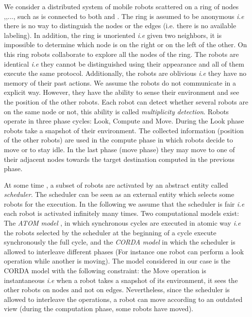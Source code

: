 \documentclass[12pt]{llncs}
\begin{document}
We consider a distributed system of mobile robots scattered on a ring of  nodes ,,...,  such as  is connected to both  and . The ring is assumed to be anonymous \textit{i.e} there is no way to distinguish the nodes or the edges (i.e. there is no available labeling). In addition, the ring is unoriented \textit{i.e} given two neighbors, it is impossible to determine which node is on the right or on the left of the other. 
On this ring  robots collaborate to explore all the nodes of the ring. The robots are identical \textit{i.e} they cannot be distinguished using their appearance and all of them execute the same protocol. Additionally, the robots are oblivious \textit{i.e} they have no memory of their past actions. We assume the robots do not communicate in a explicit way. However, they have the ability to sense their environment and see the position of the other robots. Each robot can detect whether several robots are on the same node or not, this ability is called \textit{multiplicity detection}. Robots operate in three phase cycles: Look, Compute and Move. During the Look phase robots take a snapshot of their environment. The collected information (position of the other robots) are used in the compute phase in which robots decide to move or to stay idle. In the last phase (move phase) they may move to one of their adjacent nodes towards the target destination computed in the previous phase.   

At some time , a subset of robots are activated by an abstract entity called \textit{scheduler}. The scheduler can be seen as an external entity which selects some robots for the execution. In the following we assume that the scheduler is fair \textit{i.e} each robot is activated infinitely many times. Two computational models exist: The \textit{ATOM model} \cite{yama99}, in which synchronous cycles are executed in atomic way \textit{i.e} the robots selected by the scheduler at the beginning of a cycle execute synchronously the full cycle, and the \textit{CORDA model} \cite{Pre01} in which the scheduler is allowed to interleave different phases (For instance one robot can perform a look operation while another is moving).
The model considered in our case is the CORDA model with the following constraint: the Move operation is instantaneous \textit{i.e} when a robot takes a snapshot of its environment, it sees the other robots on nodes and not on edges. Nevertheless, since the scheduler is allowed to interleave the operations, a robot can move according to an outdated view (during the computation phase, some robots have moved).
\end{document}
